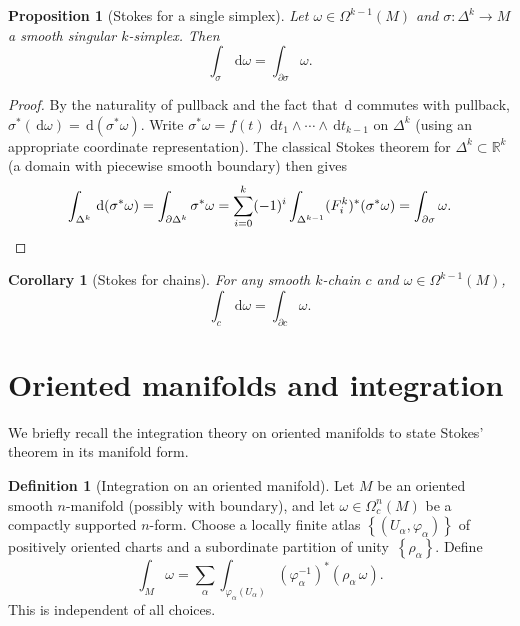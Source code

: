 \documentclass[12pt,a4paper,openany]{book}
\newtheorem{proposition}[theorem]{Proposition}
\newtheorem{corollary}[theorem]{Corollary}
\theoremstyle{definition}
\newtheorem{definition}[theorem]{Definition}
\theoremstyle{remark}
\newcommand{\R}{\mathbb{R}}
\newcommand{\dd}{\,\mathrm{d}}
\newcommand{\set}[1]{\left\{ #1 \right\}}
\begin{document}
\begin{proposition}[Stokes for a single simplex]\label{prop:stokes-simplex}
Let $\omega\in\Omega^{k-1}(M)$ and $\sigma\colon\Delta^k\to M$ a smooth
singular $k$-simplex.  Then
\[
  \int_\sigma \dd\omega = \int_{\partial\sigma} \omega.
\]
\end{proposition}

\begin{proof}
By the naturality of pullback and the fact that $\dd$ commutes with
pullback, $\sigma^*(\dd\omega) = \dd(\sigma^*\omega)$.  Write
$\sigma^*\omega = f(t)\,\dd t_1\wedge\cdots\wedge \dd t_{k-1}$ on
$\Delta^k$ (using an appropriate coordinate representation).  The
classical Stokes theorem for $\Delta^k\subset\R^k$ (a domain with
piecewise smooth boundary) then gives
\[
  \int_{\Delta^k} \dd(\sigma^*\omega)
  = \int_{\partial\Delta^k} \sigma^*\omega
  = \sum_{i=0}^k (-1)^i \int_{\Delta^{k-1}} (F_i^k)^*(\sigma^*\omega)
  = \int_{\partial\sigma}\omega. \qedhere
\]
\end{proof}

\begin{corollary}[Stokes for chains]\label{cor:stokes-chain}
For any smooth $k$-chain $c$ and $\omega\in\Omega^{k-1}(M)$,
\[
  \int_c \dd\omega = \int_{\partial c} \omega.
\]
\end{corollary}

\section{Oriented manifolds and integration}\label{sec:oriented-integration}

We briefly recall the integration theory on oriented manifolds to state
Stokes' theorem in its manifold form.

\begin{definition}[Integration on an oriented manifold]\label{def:integration-manifold}
Let $M$ be an oriented smooth $n$-manifold (possibly with boundary),
and let $\omega\in\Omega^n_c(M)$ be a compactly supported $n$-form.
Choose a locally finite atlas $\set{(U_\alpha,\varphi_\alpha)}$ of
positively oriented charts and a subordinate partition of
unity~$\set{\rho_\alpha}$.  Define
\[
  \int_M \omega = \sum_\alpha \int_{\varphi_\alpha(U_\alpha)}
    (\varphi_\alpha^{-1})^*(\rho_\alpha\,\omega).
\]
This is independent of all choices.
\end{definition}
\end{document}
